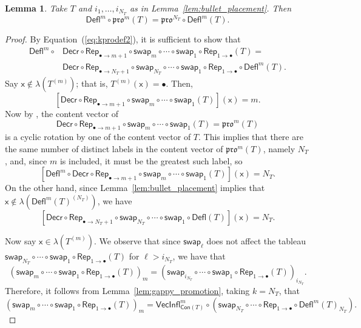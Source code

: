 \documentclass[12pt]{amsart}
\newcommand{\x}{\ensuremath{\mathsf{x}}}
\newtheorem{lemma}[theorem]{Lemma}
\theoremstyle{definition}
\theoremstyle{remark}
\numberwithin{equation}{section}
\newcommand{\pro}{\mathfrak{pro}}
\newcommand{\swap}{\ensuremath{\mathsf{swap}}}
\newcommand{\decr}{\ensuremath{\mathsf{Decr}}}
\newcommand{\rep}{\ensuremath{\mathsf{Rep}}}
\newcommand{\deflate}{\ensuremath{\mathsf{Defl}}}
\newcommand{\inflate}{\ensuremath{\mathsf{VecInfl}}}
\newcommand{\content}{\ensuremath{\mathsf{Con}}}
\begin{document}
\begin{lemma}\label{lem:deflation_commutation}
Take $T$ and $i_1, \ldots, i_{N_T}$ as in Lemma~\ref{lem:bullet_placement}. Then
\begin{equation}\label{eq:deflation_commutation}
\deflate^m \circ \pro^m(T) = \pro^{N_T} \circ \deflate^m(T).
\end{equation}

\end{lemma}
\begin{proof}
By Equation~(\ref{eq:kprodef2}), it is sufficient to show that
\begin{align*}
\deflate^m \circ &\decr \circ \rep_{\bullet \rightarrow m+1} \circ \swap_m \circ \cdots \circ \swap_1\circ \rep_{1 \rightarrow \bullet} (T) = \\
 & \decr \circ \rep_{\bullet \rightarrow N_T+1} \circ \swap_{N_T} \circ \cdots \circ \swap_1 \circ \rep_{1 \rightarrow \bullet} \circ \deflate^m (T). 
\end{align*}
Say $\x \not \in \lambda(T^{(m)})$; that is,  $T^{(m)}(\x) = \bullet$.  Then,
\[
[\decr \circ \rep_{\bullet \rightarrow m+1} \circ \swap_m \circ \cdots \circ \swap_1 (T)](\x) = m.
\]
Now by \cite[Lemma~2.1]{DPS}, the content vector of  
\[
\decr \circ \rep_{\bullet \rightarrow m+1} \circ \swap_m \circ \cdots \circ \swap_1 (T) = \pro^m(T)
\]
 is a cyclic rotation by one of the content vector of $T$. This implies that there are the same number of distinct labels in the content vector of $\pro^m(T)$, namely $N_T$, and, since $m$ is included, it must be the greatest such label, so 
 \[
 [\deflate^m \circ \decr \circ \rep_{\bullet \rightarrow m+1} \circ \swap_m \circ \cdots \circ \swap_1 (T)](\x) = N_T.
 \]
  On the other hand, since Lemma~\ref{lem:bullet_placement} implies that $\x \not \in \lambda(\deflate^m(T)^{(N_T)})$, we have
  \[
  [\decr \circ \rep_{\bullet \rightarrow N_T + 1} \circ \swap_{N_T} \circ \cdots \circ \swap_1 \circ \deflate(T)](\x) = N_T.
  \] 

Now say $\x \in \lambda(T^{(m)})$. We observe that since $\swap_\ell$ does not affect the tableau $\swap_{N_T} \circ \cdots \circ \swap_1 \circ \rep_{1 \rightarrow \bullet} (T)$ for $\ell > i_{N_T}$, we have that
\[ (\swap_m \circ \cdots \circ \swap_1 \circ \rep_{1 \rightarrow \bullet}( T ))_m = (\swap_{i_{N_T}} \circ \cdots \circ \swap_1 \circ \rep_{1 \rightarrow \bullet}( T ))_{i_{N_T}}.  \]
Therefore, it follows from Lemma~\ref{lem:gappy_promotion}, taking $k = N_T$, that 
\[ (\swap_m \circ \cdots \circ \swap_1 \circ \rep_{1 \rightarrow \bullet}( T ))_m = \inflate^m_{\content(T)} \circ (\swap_{N_T} \circ \cdots \circ  \rep_{1 \rightarrow \bullet} \circ \deflate^m(T)_{N_T}). \]


\end{proof}
\end{document}
